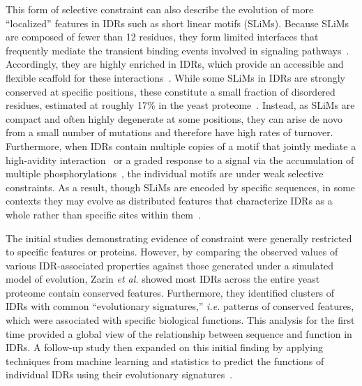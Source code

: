 This form of selective constraint can also describe the evolution of more ``localized'' features in IDRs such as short linear motifs (SLiMs). Because SLiMs are composed of fewer than 12 residues, they form limited interfaces that frequently mediate the transient binding events involved in signaling pathways~\cite{Tompa2014}. Accordingly, they are highly enriched in IDRs, which provide an accessible and flexible scaffold for these interactions~\cite{Fuxreiter2007, Davey2012}. While some SLiMs in IDRs are strongly conserved at specific positions, these constitute a small fraction of disordered residues, estimated at roughly 17\% in the yeast proteome~\cite{NguyenBa2012}. Instead, as SLiMs are compact and often highly degenerate at some positions, they can arise de novo from a small number of mutations and therefore have high rates of turnover. Furthermore, when IDRs contain multiple copies of a motif that jointly mediate a high-avidity interaction~\cite{Tompa2014} or a graded response to a signal via the accumulation of multiple phosphorylations~\cite{VanRoey2012, Wright2014}, the individual motifs are under weak selective constraints. As a result, though SLiMs are encoded by specific sequences, in some contexts they may evolve as distributed features that characterize IDRs as a whole rather than specific sites within them~\cite{Tan2010}.

The initial studies demonstrating evidence of constraint were generally restricted to specific features or proteins. However, by comparing the observed values of various IDR-associated properties against those generated under a simulated model of evolution, Zarin \textit{et al.} showed most IDRs across the entire yeast proteome contain conserved features. Furthermore, they identified clusters of IDRs with common ``evolutionary signatures,'' \textit{i.e.} patterns of conserved features, which were associated with specific biological functions. This analysis for the first time provided a global view of the relationship between sequence and function in IDRs. A follow-up study then expanded on this initial finding by applying techniques from machine learning and statistics to predict the functions of individual IDRs using their evolutionary signatures~\cite{Zarin2021}.


